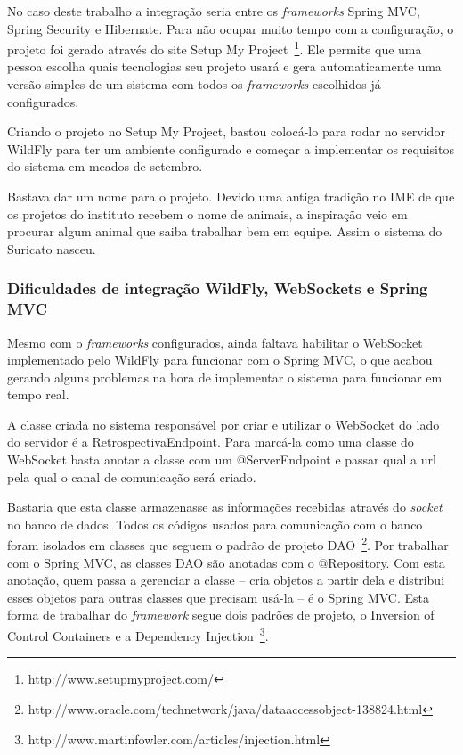 No caso deste trabalho a integração seria entre os \textit{frameworks} Spring MVC, Spring Security e Hibernate. Para não ocupar muito tempo com a configuração, o projeto foi gerado através do site Setup My Project~\footnote{http://www.setupmyproject.com/}. Ele permite que uma pessoa escolha quais tecnologias seu projeto usará e gera automaticamente uma versão simples de um sistema com todos os \textit{frameworks} escolhidos já configurados.

Criando o projeto no Setup My Project, bastou colocá-lo para rodar no servidor WildFly para ter um ambiente configurado e começar a implementar os requisitos do sistema em meados de setembro.

Bastava dar um nome para o projeto. Devido uma antiga tradição no IME de que os projetos do instituto recebem o nome de animais, a inspiração veio em procurar algum animal que saiba trabalhar bem em equipe. Assim o sistema do Suricato nasceu.

\subsubsection*{Dificuldades de integração WildFly, WebSockets e Spring MVC}

Mesmo com o \textit{frameworks} configurados, ainda faltava habilitar o WebSocket implementado pelo WildFly para funcionar com o Spring MVC, o que acabou gerando alguns problemas na hora de implementar o sistema para funcionar em tempo real.

A classe criada no sistema responsável por criar e utilizar o WebSocket do lado do servidor é a RetrospectivaEndpoint. Para marcá-la como uma classe do WebSocket basta anotar a classe com um @ServerEndpoint e passar qual a url pela qual o canal de comunicação será criado.


Bastaria que esta classe armazenasse as informações recebidas através do \textit{socket} no banco de dados. Todos os códigos usados para comunicação com o banco foram isolados em classes que seguem o padrão de projeto DAO~\footnote{http://www.oracle.com/technetwork/java/dataaccessobject-138824.html}. Por trabalhar com o Spring MVC, as classes DAO são anotadas com o @Repository. Com esta anotação, quem passa a gerenciar a classe -- cria objetos a partir dela e distribui esses objetos para outras classes que precisam usá-la -- é o Spring MVC. Esta forma de trabalhar do \textit{framework} segue dois padrões de projeto, o Inversion of Control Containers e a Dependency Injection~\footnote{http://www.martinfowler.com/articles/injection.html}.

